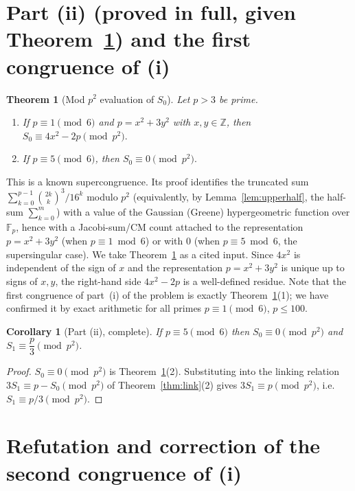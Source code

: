 \documentclass[12pt]{article}
\newtheorem{theorem}{Theorem}
\newtheorem{corollary}{Corollary}
\theoremstyle{remark}
\begin{document}
\section{Part (ii) (proved in full, given Theorem~\ref{thm:S0}) and the first
congruence of (i)}

\begin{theorem}[Mod $p^2$ evaluation of $S_0$]\label{thm:S0}
Let $p>3$ be prime.
\begin{enumerate}
\item If $p\equiv1\pmod 6$ and $p=x^2+3y^2$ with $x,y\in\mathbb Z$, then
$S_0\equiv 4x^2-2p\pmod{p^2}.$
\item If $p\equiv5\pmod 6$, then $S_0\equiv 0\pmod{p^2}.$
\end{enumerate}
\end{theorem}

This is a known supercongruence.  Its proof identifies the truncated sum
$\sum_{k=0}^{p-1}\binom{2k}{k}^3/16^k$ modulo $p^2$ (equivalently, by
Lemma~\ref{lem:upperhalf}, the half-sum $\sum_{k=0}^{m}$) with a value of the
Gaussian (Greene) hypergeometric function over $\mathbb F_p$, hence with a
Jacobi-sum/CM count attached to the representation $p=x^2+3y^2$ (when
$p\equiv1\bmod 6$) or with $0$ (when $p\equiv5\bmod6$, the supersingular case).
We take Theorem~\ref{thm:S0} as a cited input.  Since $4x^2$ is independent of
the sign of $x$ and the representation $p=x^2+3y^2$ is unique up to signs of
$x,y$, the right-hand side $4x^2-2p$ is a well-defined residue.  Note that the
first congruence of part~(i) of the problem is exactly Theorem~\ref{thm:S0}(1);
we have confirmed it by exact arithmetic for all primes $p\equiv1\pmod6$,
$p\le100$.

\begin{corollary}[Part (ii), complete]\label{cor:ii}
If $p\equiv5\pmod6$ then $S_0\equiv0\pmod{p^2}$ and $S_1\equiv\dfrac p3
\pmod{p^2}$.
\end{corollary}

\begin{proof}
$S_0\equiv0\pmod{p^2}$ is Theorem~\ref{thm:S0}(2).  Substituting into the
linking relation $3S_1\equiv p-S_0\pmod{p^2}$ of Theorem~\ref{thm:link}(2)
gives $3S_1\equiv p\pmod{p^2}$, i.e.\ $S_1\equiv p/3\pmod{p^2}$.
\end{proof}

\section{Refutation and correction of the second congruence of (i)}
\end{document}
